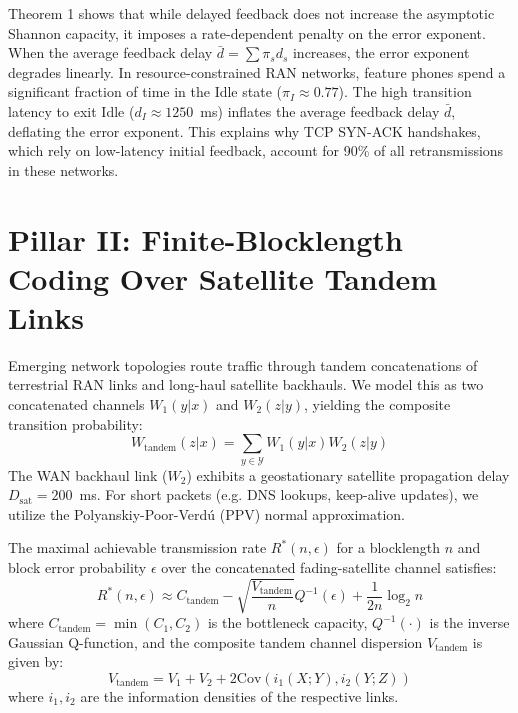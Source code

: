 \documentclass[journal]{IEEEtran}
\begin{document}
Theorem 1 shows that while delayed feedback does not increase the asymptotic Shannon capacity, it imposes a rate-dependent penalty on the error exponent. When the average feedback delay $\bar{d} = \sum \pi_s d_s$ increases, the error exponent degrades linearly. In resource-constrained RAN networks, feature phones spend a significant fraction of time in the Idle state ($\pi_I \approx 0.77$). The high transition latency to exit Idle ($d_I \approx 1250$~ms) inflates the average feedback delay $\bar{d}$, deflating the error exponent. This explains why TCP SYN-ACK handshakes, which rely on low-latency initial feedback, account for 90\% of all retransmissions in these networks.

\section{Pillar II: Finite-Blocklength Coding Over Satellite Tandem Links}
Emerging network topologies route traffic through tandem concatenations of terrestrial RAN links and long-haul satellite backhauls. We model this as two concatenated channels $W_1(y|x)$ and $W_2(z|y)$, yielding the composite transition probability:
\begin{equation}
W_{\text{tandem}}(z|x) = \sum_{y \in \mathcal{Y}} W_1(y|x) W_2(z|y)
\end{equation}
The WAN backhaul link ($W_2$) exhibits a geostationary satellite propagation delay $D_{\text{sat}} = 200$~ms. For short packets (e.g. DNS lookups, keep-alive updates), we utilize the Polyanskiy-Poor-Verdú (PPV) normal approximation.

\begin{theorem}
The maximal achievable transmission rate $R^*(n, \epsilon)$ for a blocklength $n$ and block error probability $\epsilon$ over the concatenated fading-satellite channel satisfies:
\begin{equation}
R^*(n, \epsilon) \approx C_{\text{tandem}} - \sqrt{\frac{V_{\text{tandem}}}{n}} Q^{-1}(\epsilon) + \frac{1}{2n} \log_2 n
\end{equation}
where $C_{\text{tandem}} = \min(C_1, C_2)$ is the bottleneck capacity, $Q^{-1}(\cdot)$ is the inverse Gaussian Q-function, and the composite tandem channel dispersion $V_{\text{tandem}}$ is given by:
\begin{equation}
V_{\text{tandem}} = V_1 + V_2 + 2\text{Cov}(i_1(X;Y), i_2(Y;Z))
\end{equation}
where $i_1, i_2$ are the information densities of the respective links.
\end{theorem}
\end{document}
